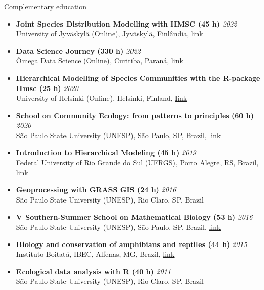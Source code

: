 \documentclass{resume}
\begin{document}
\begin{rSection}{Complementary education}

\begin{itemize} 

\item {\bf Joint Species Distribution Modelling with HMSC (45 h)} \hfill {\em 2022} 
\\ University of Jyväskylä (Online), Jyväskylä, Finlândia, \href{https://www.helsinki.fi/en/researchgroups/statistical-ecology/software/hmsc}{\underline{link}}

\item {\bf Data Science Journey (330 h)} \hfill {\em 2022} 
\\ Ômega Data Science (Online), Curitiba, Paraná, \href{https://omegadatascience.com.br/}{\underline{link}}

\item {\bf Hierarchical Modelling of Species Communities with the R-package Hmsc (25 h)} \hfill {\em 2020} 
\\ University of Helsinki (Online), Helsinki, Finland, \href{https://www.helsinki.fi/en/researchgroups/statistical-ecology/hmsc}{\underline{link}} 

\item {\bf School on Community Ecology: from patterns to principles (60 h)} \hfill {\em 2020} 
\\ São Paulo State University (UNESP), São Paulo, SP, Brazil, \href{https://www.ictp-saifr.org/community-ecology-from-patterns-to-principles}{\underline{link}}

\item {\bf Introduction to Hierarchical Modeling (45 h)} \hfill {\em 2019} 
\\ Federal University of Rio Grande do Sul (UFRGS), Porto Alegre, RS, Brazil, \href{http://ferrazlab.org/graduate}{\underline{link}}

\item {\bf Geoprocessing with GRASS GIS (24 h)} \hfill {\em 2016} 
\\ São Paulo State University (UNESP), Rio Claro, SP, Brazil

\item {\bf V Southern-Summer School on Mathematical Biology (53 h)} \hfill {\em 2016} 
\\ São Paulo State University (UNESP), São Paulo, SP, Brazil, \href{https://www.ictp-saifr.org/v-southern-summer-school-on-mathematical-biology}{\underline{link}}

\item {\bf Biology and conservation of amphibians and reptiles (44 h)} \hfill {\em 2015} 
\\ Instituto Boitatá, IBEC, Alfenas, MG, Brazil, \href{https://www.institutoboitata.org/}{\underline{link}}

\item {\bf Ecological data analysis with R (40 h)} \hfill {\em 2011} 
\\ São Paulo State University (UNESP), Rio Claro, SP, Brazil
\end{itemize} 

\end{rSection}
\end{document}
